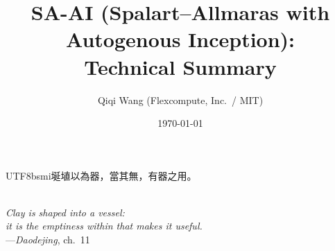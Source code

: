 \documentclass[10pt]{article}
\title{\vspace{-2em}SA-AI (Spalart--Allmaras with Autogenous Inception):\\
Technical Summary\vspace{-0.5em}}
\author{Qiqi Wang (Flexcompute, Inc.\ / MIT)}
\date{\today}
\begin{document}
\maketitle

\begin{center}
  \begin{minipage}{0.6\textwidth}\centering
  \begin{CJK}{UTF8}{bsmi}埏埴以為器，當其無，有器之用。\end{CJK}\\[3pt]
  \emph{Clay is shaped into a vessel:\\
  it is the emptiness within that makes it useful.}\\[3pt]
  ---\emph{Daodejing}, ch.~11
  \end{minipage}
\end{center}

\setcounter{tocdepth}{2}
\tableofcontents
\end{document}
